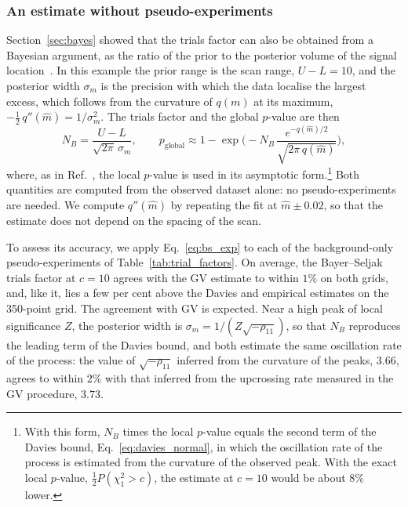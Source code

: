 \subsubsection{An estimate without pseudo-experiments}\label{sec:exp_bayes}
Section~\ref{sec:bayes} showed that the trials factor can also be obtained from a Bayesian argument, as the ratio of the prior to the posterior volume of the signal location~\cite{Bayer:2020pva}. In this example the prior range is the scan range, $U-L=10$, and the posterior width $\sigma_m$ is the precision with which the data localise the largest excess, which follows from the curvature of $q(m)$ at its maximum, $-\tfrac12\,q''(\hat m)=1/\sigma_m^2$. The trials factor and the global $p$-value are then
\begin{equation}
  N_B=\frac{U-L}{\sqrt{2\pi}\,\sigma_m},\qquad
  p_\text{global}\approx1-\exp\!\Big(-N_B\,\frac{e^{-q(\hat m)/2}}{\sqrt{2\pi\,q(\hat m)}}\Big),
  \label{eq:bs_exp}
\end{equation}
where, as in Ref.~\cite{Bayer:2020pva}, the local $p$-value is used in its asymptotic form.\footnote{With this form, $N_B$ times the local $p$-value equals the second term of the Davies bound, Eq.~\eqref{eq:davies_normal}, in which the oscillation rate of the process is estimated from the curvature of the observed peak. With the exact local $p$-value, $\tfrac12P(\chi^2_1>c)$, the estimate at $c=10$ would be about $8\%$ lower.} Both quantities are computed from the observed dataset alone: no pseudo-experiments are needed. We compute $q''(\hat m)$ by repeating the fit at $\hat m\pm0.02$, so that the estimate does not depend on the spacing of the scan.

To assess its accuracy, we apply Eq.~\eqref{eq:bs_exp} to each of the background-only pseudo-experiments of Table~\ref{tab:trial_factors}. On average, the Bayer--Seljak trials factor at $c=10$ agrees with the GV estimate to within $1\%$ on both grids, and, like it, lies a few per cent above the Davies and empirical estimates on the 350-point grid. The agreement with GV is expected. Near a high peak of local significance $Z$, the posterior width is $\sigma_m=1/(Z\sqrt{-\rho_{11}})$, so that $N_B$ reproduces the leading term of the Davies bound, and both estimate the same oscillation rate of the process: the value of $\sqrt{-\rho_{11}}$ inferred from the curvature of the peaks, $3.66$, agrees to within 2\% with that inferred from the upcrossing rate measured in the GV procedure, $3.73$.

